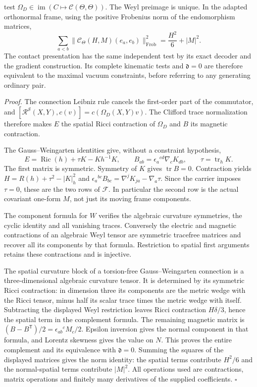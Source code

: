 \documentclass[
  english,
  11pt,
  reqno]{amsart}
\begin{document}
test
\(\Omega_D\in\operatorname{im}(C\mapsto\mathcal C(\Theta,\Theta))\). The
Weyl preimage is unique. In the adapted orthonormal frame, using the
positive Frobenius norm of the endomorphism matrices,%
 \[
\sum_{a<b}\|\mathcal C_\Theta(H,M)(e_a,e_b)\|_{\mathrm{Frob}}^2
=\frac{H^2}{6}+|M|^2.
\] The contact presentation has the same independent test by its exact
decoder and the gradient construction. Its complete kinematic tests and
\(\mathfrak d=0\) are therefore equivalent to the maximal vacuum
constraints, before referring to any generating ordinary pair.

\emph{Proof.} The connection Leibniz rule cancels the first-order part
of the commutator, and
\([\mathcal R^{\mathscr S}(X,Y),c(v)]=c(\Omega_D(X,Y)v)\). The Clifford
trace normalization therefore makes \(E\) the spatial Ricci contraction
of \(\Omega_D\) and \(B\) its magnetic contraction.

The Gauss--Weingarten identities give, without a constraint hypothesis,
\[
E=\operatorname{Ric}(h)+\tau K-Kh^{-1}K,
\qquad B_{ab}=\epsilon_a{}^{cd}\nabla_cK_{db},
\qquad \tau=\operatorname{tr}_hK.
\] The first matrix is symmetric. Symmetry of \(K\) gives
\(\operatorname{tr}B=0\). Contraction yields \(H=R(h)+\tau^2-|K|_h^2\)
and \(\epsilon_a{}^{bc}B_{bc}=\nabla^jK_{ja}-\nabla_a\tau\). Since the
carrier imposes \(\tau=0\), these are the two rows of \(\mathcal F\). In
particular the second row is the actual covariant one-form \(M\), not
just its moving frame components.

The component formula for \(W\) verifies the algebraic curvature
symmetries, the cyclic identity and all vanishing traces. Conversely the
electric and magnetic contractions of an algebraic Weyl tensor are
symmetric tracefree matrices and recover all its components by that
formula. Restriction to spatial first arguments retains these
contractions and is injective.

The spatial curvature block of a torsion-free Gauss--Weingarten
connection is a three-dimensional algebraic curvature tensor. It is
determined by its symmetric Ricci contraction: in dimension three its
components are the metric wedge with the Ricci tensor, minus half its
scalar trace times the metric wedge with itself. Subtracting the
displayed Weyl restriction leaves Ricci contraction \(H\delta/3\), hence
the spatial term in the complement formula. The remaining magnetic
matrix is \((B-B^{\mathsf T})/2=\epsilon_{ab}{}^cM_c/2\). Epsilon
inversion gives the normal component in that formula, and Lorentz
skewness gives the value on \(N\). This proves the entire complement and
its equivalence with \(\mathfrak d=0\). Summing the squares of the
displayed matrices gives the norm identity: the spatial terms contribute
\(H^2/6\) and the normal-spatial terms contribute \(|M|^2\). All
operations used are contractions, matrix operations and finitely many
derivatives of the supplied coefficients. \hfill\(\square\)
\end{document}
